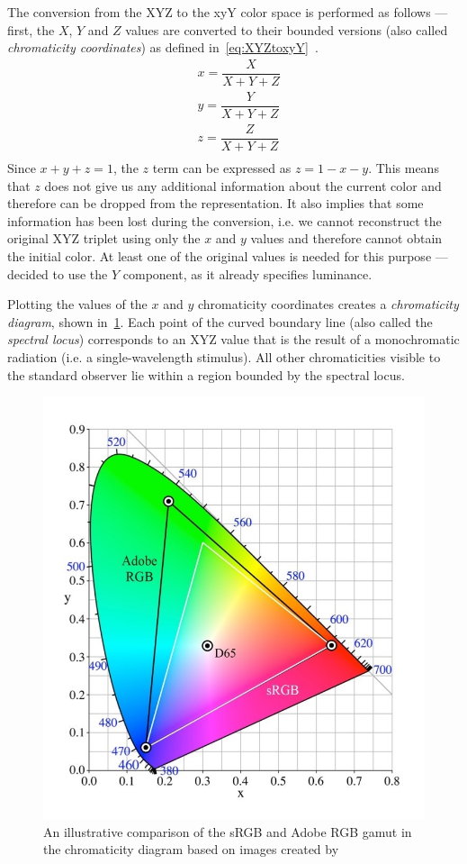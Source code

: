 The conversion from the XYZ to the xyY color space is performed as follows --- first, the $X$, $Y$ and $Z$ values are converted to their bounded versions (also called \emph{chromaticity coordinates}) as defined in~\cref{eq:XYZtoxyY}~\cite{xyYEquations}.
\begin{equation} \label{eq:XYZtoxyY}
\begin{aligned}
&x=\dfrac{X}{X+Y+Z}\\
&y=\dfrac{Y}{X+Y+Z}\\
&z=\dfrac{Z}{X+Y+Z}\\
\end{aligned}
\end{equation}
Since $x+y+z=1$, the $z$ term can be expressed as $z=1-x-y$. This means that $z$ does not give us any additional information about the current color and therefore can be dropped from the representation. It also implies that some information has been lost during the conversion, i.e. we cannot reconstruct the original XYZ triplet using only the $x$ and $y$ values and therefore cannot obtain the initial color. At least one of the original values is needed for this purpose ---~\citet{CIE} decided to use the $Y$ component, as it already specifies luminance.

Plotting the values of the $x$ and $y$ chromaticity coordinates creates a \emph{chromaticity diagram}, shown in~\cref{fig:chromaticityDiagram}. Each point of the curved boundary line (also called the \emph{spectral locus}) corresponds to an XYZ value that is the result of a monochromatic radiation (i.e. a single-wavelength stimulus). All other chromaticities visible to the standard observer lie within a region bounded by the spectral locus.

\begin{figure}[t!]
	\centering
	\includegraphics[width=0.6\linewidth,height=0.3\textheight]{img/chromaticity_diagram.jpeg}
	\caption{An illustrative comparison of the sRGB and Adobe RGB gamut in the chromaticity diagram based on images created by~\citet{chromaticityDiagramResource}}
	\label{fig:chromaticityDiagram}
\end{figure}

